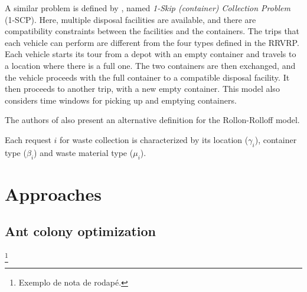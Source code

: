 A similar problem is defined by \citet{Archetti05}, named \textit{1-Skip
(container) Collection Problem} (1-SCP). Here, multiple disposal facilities are
available, and there are compatibility constraints between the facilities and
the containers. The trips that each vehicle can perform are different from the
four types defined in the RRVRP. Each vehicle starts its tour from a depot with
an empty container and travels to a location where there is a full one. The two
containers are then exchanged, and the vehicle proceeds with the full container
to a compatible disposal facility. It then proceeds to another trip, with a new
empty container. This model also considers time windows for picking up and
emptying containers.

The authors of \citet{Aringhieri04} also present an alternative definition for
the Rollon-Rolloff model. 

Each request $i$ for waste collection is
characterized by its location ($\gamma_i$), container type ($\beta_{i}$) and
waste material type ($\mu_i$). 






\section{Approaches}

\subsection{Ant colony optimization}


\footnote{Exemplo de nota de rodapé.}

